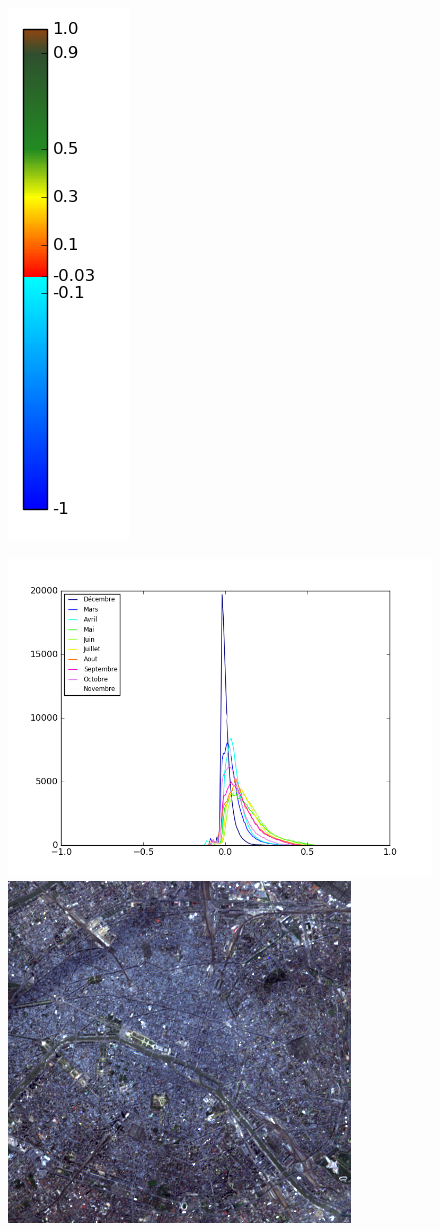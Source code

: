 \documentclass{book}
\begin{document}
\begin{figure}[H]
{\includegraphics[scale=0.2]{images/colormap.png}
}
\begin{center}
\includegraphics[scale=0.45]{images/Paris/all_ndvi_histo.png}
\includegraphics[scale=0.5]{images/Paris/04_rgb.png}

\end{center}
\end{figure}
\end{document}
